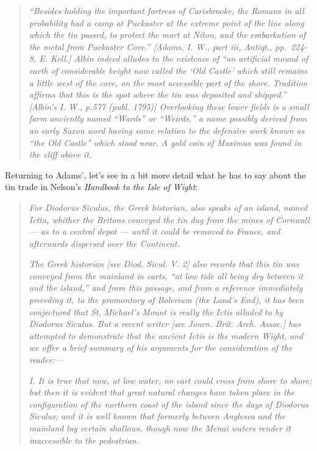 \documentclass[
  12pt,
  a5paper,
  twoside]{book}
\begin{document}
\begin{quote}
\emph{``Besides holding the important fortress of Carisbrooke, the
Romans in all probability had a camp at Puckaster at the extreme point
of the line along which the tin passed, to protect the mart at Niton,
and the embarkation of the metal from Puckaster Cove.'' {[}Adams, I. W.,
part iii, Antiqt., pp.~224-8, E. Kell.{]} Albin indeed alludes to the
existence of ``an artificial mound of earth of considerable height now
called the `Old Castle' which still remains a little west of the cove,
on the most accessible part of the shore. Tradition affirms that this is
the spot where the tin was deposited and shipped.'' {[}Albin's I. W.,
p.577 (publ. 1795){]} Overlooking these lower fields is a small farm
anciently named ``Wards'' or ``Weirds,'' a name possibly derived from an
early Saxon word having some relation to the defensive work known as
``the Old Castle'' which stood near. A gold coin of Maximus was found in
the cliff above it.}
\end{quote}

Returning to Adams', let's see in a bit more detail what he has to say
about the tin trade in Nelson's \emph{Handbook to the Isle of Wight}:

\begin{quote}
\emph{For Diodorus Siculus, the Greek historian, also speaks of an
island, named Ictta, whither the Britons conveyed the tin dug from the
mines of Cornwall --- as to a central depot --- until it could be
removed to France, and afterwards dispersed over the Continent.}

\emph{The Greek historian {[}see Diod. Sicul. V. 2{]} also records that
this tin was conveyed from the mainland in carts, ``at low tide all
being dry between it and the island,'' and from this passage, and from a
reference immediately preceding it, to the promontory of Bolerium (the
Land's End), it has been conjectured that St, Michael's Mount is really
the Ictis alluded to by Diodorus Siculus. But a recent writer {[}see
Journ. Brit. Arch. Assoc.{]} has attempted to demonstrate that the
ancient Ictis is the modern Wight, and we offer a brief summary of his
arguments for the consideration of the reader:---}

\emph{I. It is true that now, at low water, no cart could cross from
shore to shore; but then it is evident that great natural changes have
taken place in the configuration of the northern coast of the island
since the days of Diodorus Siculus; and it is well known that formerly
between Anglesea and the mainland lay certain shallows, though now the
Menai waters render it inaccessible to the pedestrian.}
\end{quote}
\end{document}
